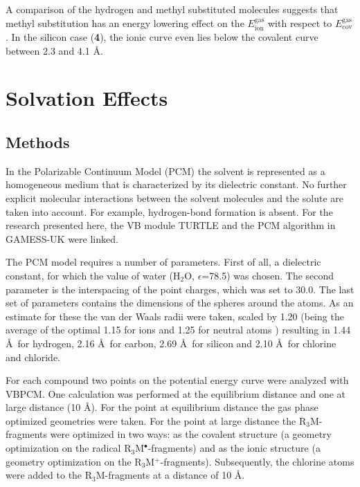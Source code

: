 A comparison of the hydrogen and methyl substituted molecules suggests that methyl substitution has an energy lowering effect on the $E_\mathrm{ion}^\mathrm{gas}$ with respect to $E_\mathrm{cov}^\mathrm{gas}$. In the silicon case (\textbf{4}), the ionic curve even lies below the covalent curve between 2.3 and 4.1 \AA.

\section{\label{ch3.sec.solv}Solvation Effects}

\subsection{Methods}

In the Polarizable Continuum Model (PCM) the solvent is represented as a homogeneous medium that is characterized by its dielectric constant. No further explicit molecular interactions between the solvent molecules and the solute are taken into account. For example, hydrogen-bond formation is absent. For the research presented here, the VB module TURTLE and the PCM algorithm in GAMESS-UK were linked.

The PCM model requires a number of parameters. First of all, a dielectric constant, for which the value of water (H$_2$O, $\epsilon$=78.5) was chosen. The second parameter is the interspacing of the point charges, which was set to 30.0\degrees. The last set of parameters contains the dimensions of the spheres around the atoms. As an estimate for these the van der Waals radii \cite{bondi} were taken, scaled by 1.20 (being the average of the optimal 1.15 for ions and 1.25 for neutral atoms \cite{scaling}) resulting in 1.44 \AA\  for hydrogen, 2.16 \AA\  for carbon, 2.69 \AA\ for silicon and 2.10 \AA\ for chlorine and chloride.

For each compound two points on the potential energy curve were analyzed with VBPCM. One calculation was performed at the equilibrium distance and one at large distance (10 \AA). For the point at equilibrium distance the gas phase optimized geometries were taken. For the point at large distance the R$_3$M-fragments were optimized in two ways: as the covalent structure (a geometry optimization on the radical R$_3$M$^\bullet$-fragments) and as the ionic structure (a geometry optimization on the R$_3$M$^{+}$-fragments). Subsequently, the chlorine atoms were added to the R$_3$M-fragments at a distance of 10 \AA. 

